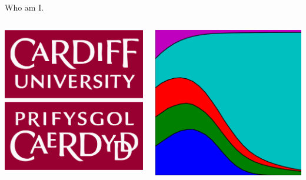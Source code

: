 \documentclass{beamer}
\begin{document}
\begin{frame}{Who am I.}
\begin{columns}[T]
\begin{column}{.2\textwidth}
  		\includegraphics[width=\textwidth]{static/cardiff_uni_logo.jpg}
\end{column}%
\begin{column}{.2\textwidth}
  		\includegraphics[width=\textwidth]{static/axelrod-logo.png}


\end{column}
\end{columns}
\end{frame}
\end{document}
